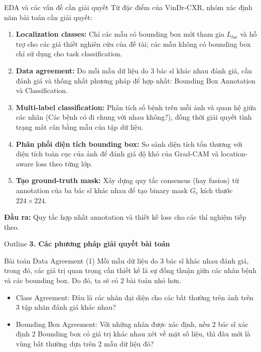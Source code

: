 \documentclass[10pt]{beamer}
\begin{document}
\begin{frame}{EDA và các vấn đề cần giải quyết}\small
    Từ đặc điểm của VinDr-CXR, nhóm xác định năm bài toán cần giải quyết:
    \begin{enumerate}
        \item \textbf{Localization classes:} Chỉ các mẫu có bounding box mới tham gia $L_{loc}$ và hỗ trợ cho các giả thiết nghiên cứu của đề tài; các mẫu không có bounding box chỉ sử dụng cho task classification.
        \item \textbf{Data agreement:} Do mỗi mẫu dữ liệu do 3 bác sĩ khác nhau đánh giá, cần đánh giá và thống nhất phương pháp để hợp nhất: Bounding Box Annotation và Classification.
        \item \textbf{Multi-label classification:} Phân tích số bệnh trên mỗi ảnh và quan hệ giữa các nhãn (Các bệnh có đi chung với nhau không?), đồng thời giải quyết tình trạng mất cân bằng mẫu của tập dữ liệu.
        \item \textbf{Phân phối diện tích bounding box:} So sánh diện tích tổn thương với diện tích toàn cục của ảnh để đánh giá độ khó của Grad-CAM và location-aware loss theo từng lớp.
        \item \textbf{Tạo ground-truth mask:} Xây dựng quy tắc consensus (hay fusion) từ annotation của ba bác sĩ khác nhau để tạo binary mask $G_c$ kích thước $224 \times 224$.
    \end{enumerate}

    \vspace{0.1cm}
    \textbf{Đầu ra:} Quy tắc hợp nhất annotation và thiết kế loss cho các thí nghiệm tiếp theo.
\end{frame}

\begin{frame}{Outline}
    \centering
    \Large \textbf{3. Các phương pháp giải quyết bài toán}
\end{frame}

\begin{frame}{Bài toán Data Agreement (1)}
    Mỗi mẫu dữ liệu do 3 bác sĩ khác nhau đánh giá, trong đó, các giá trị quan trọng cần thiết kế là sự đồng thuận giữa các nhãn bệnh và các bounding box. Do đó, ta sẽ có 2 bài toán nhỏ hơn.
    \begin{itemize}
        \item Class Agreement: Đâu là các nhãn đại diện cho các bất thường trên ảnh trên 3 tập nhãn đánh giá khác nhau?
        \item Bounding Box Agreement: Với những nhãn được xác định, nếu 2 bác sĩ xác định 2 Bounding box có giá trị khác nhau xét về mặt số liệu, thì đâu mới là vùng bất thường dựa trên 2 mẫu dữ liệu đó?
    \end{itemize}
\end{frame}
\end{document}

